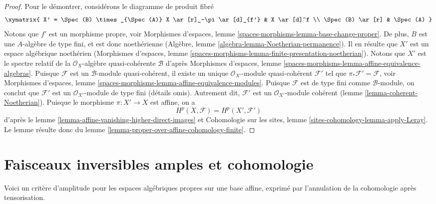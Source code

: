 \begin{proof}
Pour le démontrer, considérons le diagramme de produit fibré
$$
\xymatrix{
X' = \Spec(B) \times_{\Spec(A)} X
\ar[r]_-\pi \ar[d]_{f'} &
X \ar[d]^f \\
\Spec(B) \ar[r] &
\Spec(A)
}
$$
Notons que $f'$ est un morphisme propre, voir
Morphismes d'espaces, lemme \ref{spaces-morphisms-lemma-base-change-proper}.
De plus, $B$ est une $A$-algèbre de type fini, et est donc
noethérienne (Algèbre, lemme \ref{algebra-lemma-Noetherian-permanence}).
Il en résulte que $X'$ est un espace algébrique noethérien
(Morphismes d'espaces, lemme
\ref{spaces-morphisms-lemma-finite-presentation-noetherian}).
Notons que $X'$ est le spectre relatif de la
$\mathcal{O}_X$-algèbre quasi-cohérente $\mathcal{B}$ d'après
Morphismes d'espaces, lemme
\ref{spaces-morphisms-lemma-affine-equivalence-algebras}.
Puisque $\mathcal{F}$ est un $\mathcal{B}$-module quasi-cohérent,
il existe un unique
$\mathcal{O}_{X'}$-module quasi-cohérent $\mathcal{F}'$ tel que
$\pi_*\mathcal{F}' = \mathcal{F}$, voir
Morphismes d'espaces, lemme
\ref{spaces-morphisms-lemma-affine-equivalence-modules}.
Puisque $\mathcal{F}$ est de type fini comme $\mathcal{B}$-module, on
conclut que $\mathcal{F}'$ est un
$\mathcal{O}_{X'}$-module de type fini (détails omis). Autrement dit,
$\mathcal{F}'$ est un $\mathcal{O}_{X'}$-module cohérent
(lemme \ref{lemma-coherent-Noetherian}).
Puisque le morphisme $\pi : X' \to X$ est affine, on a
$$
H^p(X, \mathcal{F}) = H^p(X', \mathcal{F}')
$$
d'après le
lemme \ref{lemma-affine-vanishing-higher-direct-images}
et
Cohomologie sur les sites, lemme \ref{sites-cohomology-lemma-apply-Leray}.
Le lemme résulte donc du
lemme \ref{lemma-proper-over-affine-cohomology-finite}.
\end{proof}









\section{Faisceaux inversibles amples et cohomologie}
\label{section-ample-cohomology}

\noindent
Voici un critère d'amplitude pour les espaces algébriques propres sur une base affine,
exprimé par l'annulation de la cohomologie après tensorisation.

